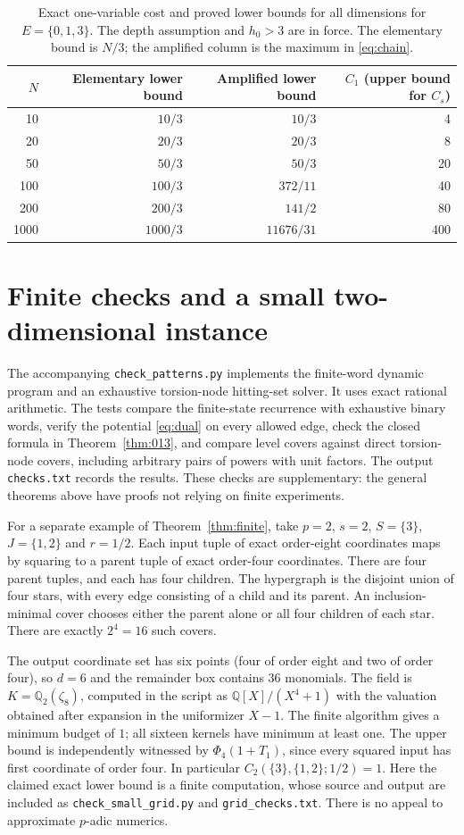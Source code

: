 \documentclass[11pt]{article}
\theoremstyle{definition}
\begin{document}
\begin{table}[htbp]
\centering
\caption{Exact one-variable cost and proved lower bounds for all dimensions for $E=\{0,1,3\}$. The depth assumption and $h_0>3$ are in force. The elementary bound is $N/3$; the amplified column is the maximum in \eqref{eq:chain}.}
\label{tab:bounds}
\begin{tabular}{rrrr}
\toprule
$N$&Elementary lower bound&Amplified lower bound&$C_1$ (upper bound for $C_s$)\\\midrule
10&$10/3$&$10/3$&4\\
20&$20/3$&$20/3$&8\\
50&$50/3$&$50/3$&20\\
100&$100/3$&$372/11$&40\\
200&$200/3$&$141/2$&80\\
1000&$1000/3$&$11676/31$&400\\
\bottomrule
\end{tabular}
\end{table}

\section{Finite checks and a small two-dimensional instance}

The accompanying \texttt{check\_patterns.py} implements the finite-word dynamic program and an exhaustive torsion-node hitting-set solver. It uses exact rational arithmetic. The tests compare the finite-state recurrence with exhaustive binary words, verify the potential \eqref{eq:dual} on every allowed edge, check the closed formula in Theorem~\ref{thm:013}, and compare level covers against direct torsion-node covers, including arbitrary pairs of powers with unit factors. The output \texttt{checks.txt} records the results. These checks are supplementary: the general theorems above have proofs not relying on finite experiments.

For a separate example of Theorem~\ref{thm:finite}, take $p=2$, $s=2$, $S=\{3\}$, $J=\{1,2\}$ and $r=1/2$. Each input tuple of exact order-eight coordinates maps by squaring to a parent tuple of exact order-four coordinates. There are four parent tuples, and each has four children. The hypergraph is the disjoint union of four stars, with every edge consisting of a child and its parent. An inclusion-minimal cover chooses either the parent alone or all four children of each star. There are exactly $2^4=16$ such covers.

The output coordinate set has six points (four of order eight and two of order four), so $d=6$ and the remainder box contains 36 monomials. The field is $K=\mathbb Q_2(\zeta_8)$, computed in the script as $\mathbb Q[X]/(X^4+1)$ with the valuation obtained after expansion in the uniformizer $X-1$. The finite algorithm gives a minimum budget of $1$; all sixteen kernels have minimum at least one. The upper bound is independently witnessed by $\Phi_4(1+T_1)$, since every squared input has first coordinate of order four. In particular $C_2(\{3\},\{1,2\};1/2)=1$. Here the claimed exact lower bound is a finite computation, whose source and output are included as \texttt{check\_small\_grid.py} and \texttt{grid\_checks.txt}. There is no appeal to approximate $p$-adic numerics.
\end{document}
